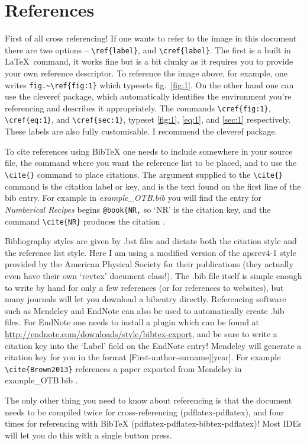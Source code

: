 \documentclass[a4paper,11pt,twoside]{article}		%
\begin{document}
\section{References}
\label{sec:4}
First of all cross referencing! If one wants to refer to the image in this document there are two options -- \verb:\ref{label}:, and \verb:\cref{label}:. The first is a built in \LaTeX\ command, it works fine but is a bit clunky as it requires you to provide your own reference descriptor. To reference the image above, for example, one writes \verb;fig.~\ref{fig:1}; which typesets fig.~\ref{fig:1}. On the other hand one can use the cleveref package, which automatically identifies the environment you're referencing and describes it appropriately. The commands \verb;\cref{fig:1};, \verb;\cref{eq:1};, and \verb;\cref{sec:1};, typeset \cref{fig:1}, \cref{eq:1}, and \cref{sec:1} respectively. These labels are also fully customisable. I recommend the cleveref package.

To cite references using BibTeX one needs to include \verb:: somewhere in your source file, the command \verb:: where you want the reference list to be placed, and to use the \verb:\cite{}: command to place citations. The argument supplied to the \verb:\cite{}: command is the citation label or key, and is the text found on the first line of the bib entry. For example in \emph{example\_OTB.bib} you will find the entry for \emph{Numberical Recipes} begins \verb:@book{NR,: so `NR' is the citation key, and the command \verb:\cite{NR}: produces the citation \cite{NR}.

Bibliography styles are given by .bst files and dictate both the citation style and the reference list style. Here I am using a modified version of the apsrev4-1 style provided by the American Physical Society for their publications (they actually even have their own `revtex' document class!). The .bib file itself is simple enough to write by hand for only a few references (or for references to websites), but many journals will let you download a bibentry directly. Referencing software such as Mendeley and EndNote can also be used to automatically create .bib files. For EndNote one needs to install a plugin which can be found at \url{http://endnote.com/downloads/style/bibtex-export}, and be sure to write a citation key into the `Label' field on the EndNote entry! Mendeley will generate a citation key for you in the format [First-author-surname][year]. For example \verb:\cite{Brown2013}: references a paper exported from Mendeley in example\_OTB.bib \cite{Brown2013}.  

The only other thing you need to know about referencing is that the document needs to be compiled twice for cross-referencing (pdflatex-pdflatex), and four times for referencing with BibTeX (pdflatex-pdflatex-bibtex-pdflatex)! Most IDEs will let you do this with a single button press.



\end{document}
